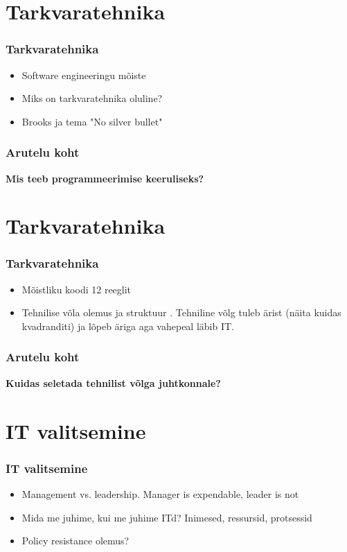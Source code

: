 \section{Tarkvaratehnika}
\begin{frame}[fragile]
  \frametitle{Tarkvaratehnika}
	\begin{itemize}
		\item Software engineeringu mõiste
		\item Miks on tarkvaratehnika oluline? \cite{spolsky2004joel2}
		\item Brooks ja tema "No silver bullet" \cite{brooks1975mythical}
	\end{itemize}
\end{frame}


\begin{frame}[fragile]
  \frametitle{Arutelu koht}
		\begin{center}
			\textbf{Mis teeb programmeerimise keeruliseks?}
		\end{center}
\end{frame}

\section{Tarkvaratehnika}
\begin{frame}[fragile]
  \frametitle{Tarkvaratehnika}
	\begin{itemize}
		\item Mõistliku koodi 12 reeglit \cite{spolsky2004joel}
		\item Tehnilise võla olemus ja struktuur \cite{fowlerdebt}. Tehniline võlg tuleb ärist (näita kuidas kvadranditi) ja lõpeb äriga aga vahepeal läbib IT.
	\end{itemize}
\end{frame}

\begin{frame}[fragile]
  \frametitle{Arutelu koht}
		\begin{center}
			\textbf{Kuidas seletada tehnilist võlga juhtkonnale?}
		\end{center}
\end{frame}

\section{IT valitsemine}
\begin{frame}[fragile]
  \frametitle{IT valitsemine}
	\begin{itemize}
		\item Management vs. leadership. Manager is expendable, leader is not
		\item Mida me juhime, kui me juhime ITd? Inimesed, ressursid, protsessid
		\item Policy resistance olemus?
	\end{itemize}
\end{frame}

